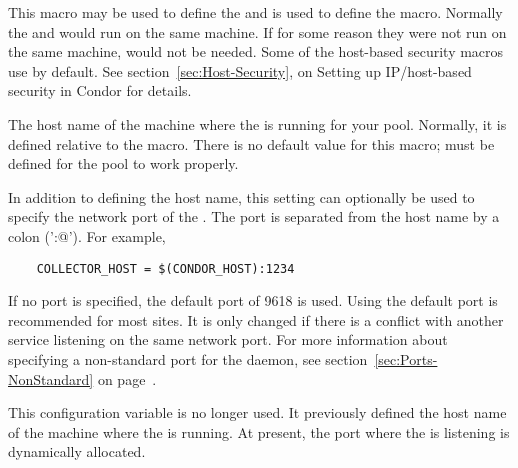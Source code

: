 \begin{description}
  
\label{param:CondorHost}
\item[\Macro{CONDOR\_HOST}]
  This macro may be
  used to define the  and is used to define the
   macro.  Normally the 
  and  would run on the same machine.  If for some
  reason they were not run on the same machine,
   would not be needed.  Some
  of the host-based security macros use  by
  default.  See section~\ref{sec:Host-Security}, on Setting up
  IP/host-based security in Condor for details.
  
\label{param:CollectorHost}
\item[\Macro{COLLECTOR\_HOST}]
  The host name of the machine where the  is running for
  your pool.  Normally, it is defined relative to
  the 
  macro.  There is no default value for this macro;
   must be defined for the pool to work
  properly.

  In addition to defining the host name, this setting can optionally be
  used to specify the network port of the .
  The port is separated from the host name by a colon ('\verb@:@').
  For example,
  \begin{verbatim}
    COLLECTOR_HOST = $(CONDOR_HOST):1234
  \end{verbatim}
  If no port is specified, the default port of 9618 is used.
  Using the default port is recommended for most sites.
  It is only changed if there is a conflict with another
  service listening on the same network port.
  For more information about specifying a non-standard port for the
   daemon,
  see section~\ref{sec:Ports-NonStandard} on
  page~\pageref{sec:Ports-NonStandard}.


\label{param:NegotiatorHost} 
\item[\Macro{NEGOTIATOR\_HOST}]
  This configuration variable is no longer used.
  It previously defined the host name of the machine where 
  the  is running.
  At present, the port where the  is listening 
  is dynamically allocated.



\end{description}
